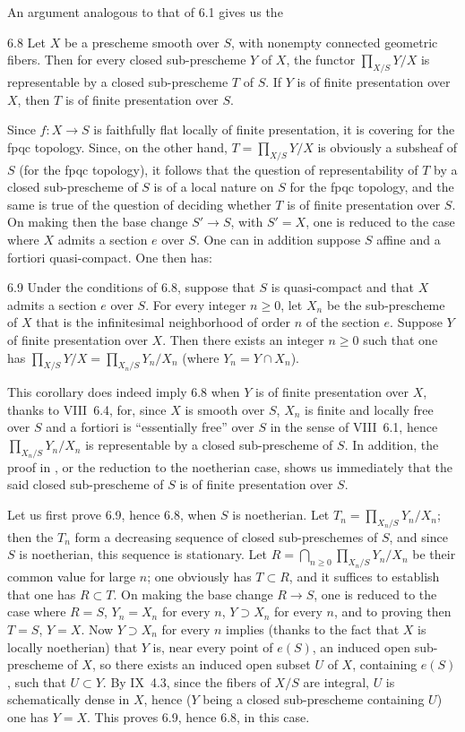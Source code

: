 An argument analogous to that of 6.1 gives us the
\begin{theorem}{6.8}\label{XI.6.8}
Let $X$ be a prescheme smooth over $S$, with nonempty connected geometric fibers. Then for every closed sub-prescheme $Y$ of $X$, the functor $\prod_{X/S}Y/X$ is representable by a closed sub-prescheme $T$ of $S$. If $Y$ is of finite presentation over $X$, then $T$ is of finite presentation over $S$.
\end{theorem}
Since $f:X\to S$ is faithfully flat locally of finite presentation, it is covering for the fpqc topology. Since, on the other hand, $T=\prod_{X/S}Y/X$ is obviously a subsheaf of $S$ (for the fpqc topology), it follows that the question of representability of $T$ by a closed sub-prescheme of $S$ is of a local nature on $S$ for the fpqc topology, and the same is true of the question of deciding whether $T$ is of finite presentation over $S$. On making then the base change $S'\to S$, with $S'=X$, one is reduced to the case where $X$ admits a section $e$ over $S$. One can in addition suppose $S$ affine and a fortiori quasi-compact. One then has:
\begin{corollary}{6.9}\label{XI.6.9}
Under the conditions of 6.8, suppose that $S$ is quasi-compact and that $X$ admits a section $e$ over $S$. For every integer $n\ge0$, let $X_n$ be the sub-prescheme of $X$ that is the infinitesimal neighborhood of order $n$ of the section $e$. Suppose $Y$ of finite presentation over $X$. Then there exists an integer $n\ge0$ such that one has $\prod_{X/S}Y/X=\prod_{X_n/S}Y_n/X_n$ (where $Y_n=Y\cap X_n$).
\end{corollary}
This corollary does indeed imply 6.8 when $Y$ is of finite presentation over $X$, thanks to VIII~6.4, for, since $X$ is smooth over $S$, $X_n$ is finite and locally free over $S$ and a fortiori is ``essentially free'' over $S$ in the sense of VIII~6.1, hence $\prod_{X_n/S}Y_n/X_n$ is representable by a closed sub-prescheme of $S$. In addition, the proof in \loccit, or the reduction to the noetherian case, shows us immediately that the said closed sub-prescheme of $S$ is of finite presentation over $S$.

Let us first prove 6.9, hence 6.8, when $S$ is noetherian. Let $T_n=\prod_{X_n/S}Y_n/X_n$; then the $T_n$ form a decreasing sequence of closed sub-preschemes of $S$, and since $S$ is noetherian, this sequence is stationary. Let $R=\bigcap_{n\ge0}\prod_{X_n/S}Y_n/X_n$ be their common value for large $n$; one obviously has $T\subset R$, and it suffices to establish that one has $R\subset T$. On making the base change $R\to S$, one is reduced to the case where $R=S$, \ie $Y_n=X_n$ for every $n$, \ie $Y\supset X_n$ for every $n$, and to proving then $T=S$, \ie $Y=X$. Now $Y\supset X_n$ for every $n$ implies (thanks to the fact that $X$ is locally noetherian) that $Y$ is, near every point of $e(S)$, an induced open sub-prescheme of $X$, so there exists an induced open subset $U$ of $X$, containing $e(S)$, such that $U\subset Y$. By IX~4.3, since the fibers of $X/S$ are integral, $U$ is schematically dense in $X$, hence ($Y$ being a closed sub-prescheme containing $U$) one has $Y=X$. This proves 6.9, hence 6.8, in this case.

